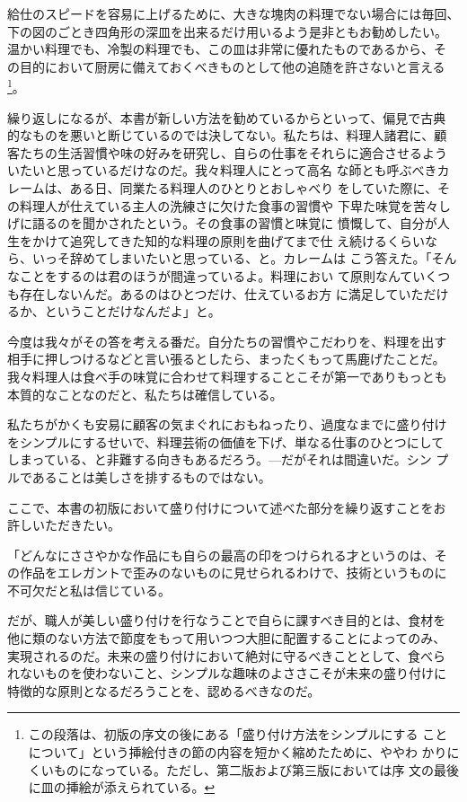 給仕のスピードを容易に上げるために、大きな塊肉の料理でない場合には毎回、
下の図のごとき四角形の深皿を出来るだけ用いるよう是非ともお勧めしたい。
温かい料理でも、冷製の料理でも、この皿は非常に優れたものであるから、そ
の目的において厨房に備えておくべきものとして他の追随を許さないと言える
\footnote{この段落は、初版の序文の後にある「盛り付け方法をシンプルにする
  ことについて」という挿絵付きの節の内容を短かく縮めたために、ややわ
  かりにくいものになっている。ただし、第二版および第三版においては序
  文の最後に皿の挿絵が添えられている。}。

繰り返しになるが、本書が新しい方法を勧めているからといって、偏見で古典
的なものを悪いと断じているのでは決してない。私たちは、料理人諸君に、顧
客たちの生活習慣や味の好みを研究し、自らの仕事をそれらに適合させるよう
いたいと思っているだけなのだ。我々料理人にとって高名
な師とも呼ぶべきカレームは、ある日、同業たる料理人のひとりとおしゃべり
をしていた際に、その料理人が仕えている主人の洗練さに欠けた食事の習慣や
下卑た味覚を苦々しげに語るのを聞かされたという。その食事の習慣と味覚に
憤慨して、自分が人生をかけて追究してきた知的な料理の原則を曲げてまで仕
え続けるくらいなら、いっそ辞めてしまいたいと思っている、と。カレームは
こう答えた。「そんなことをするのは君のほうが間違っているよ。料理におい
て原則なんていくつも存在しないんだ。あるのはひとつだけ、仕えているお方
に満足していただけるか、ということだけなんだよ」と。

今度は我々がその答を考える番だ。自分たちの習慣やこだわりを、料理を出す
相手に押しつけるなどと言い張るとしたら、まったくもって馬鹿げたことだ。
我々料理人は食べ手の味覚に合わせて料理することこそが第一でありもっとも
本質的なことなのだと、私たちは確信している。

私たちがかくも安易に顧客の気まぐれにおもねったり、過度なまでに盛り付け
をシンプルにするせいで、料理芸術の価値を下げ、単なる仕事のひとつにして
しまっている、と非難する向きもあるだろう。---だがそれは間違いだ。シン
プルであることは美しさを排するものではない。

ここで、本書の初版において盛り付けについて述べた部分を繰り返すことをお
許しいただきたい。

「どんなにささやかな作品にも自らの最高の印をつけられる才というのは、そ
の作品をエレガントで歪みのないものに見せられるわけで、技術というものに
不可欠だと私は信じている。

だが、職人が美しい盛り付けを行なうことで自らに課すべき目的とは、食材を
他に類のない方法で節度をもって用いつつ大胆に配置することによってのみ、
実現されるのだ。未来の盛り付けにおいて絶対に守るべきこととして、食べら
れないものを使わないこと、シンプルな趣味のよささこそが未来の盛り付けに
特徴的な原則となるだろうことを、認めるべきなのだ。

